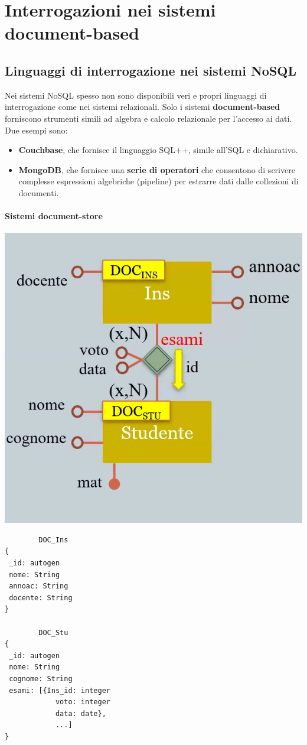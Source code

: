 \documentclass{report}
\begin{document}
\chapter{Interrogazioni nei sistemi document-based}

\section{Linguaggi di interrogazione nei sistemi NoSQL}

Nei sistemi NoSQL spesso non sono disponibili veri e propri linguaggi di interrogazione come nei sistemi relazionali. Solo i sistemi \textbf{document-based} forniscono strumenti simili ad algebra e calcolo relazionale per l'accesso ai dati. Due esempi sono:
\begin{itemize}
\item \textbf{Couchbase}, che fornisce il linguaggio SQL++, simile all'SQL e dichiarativo.
\item \textbf{MongoDB}, che fornisce una \textbf{serie di operatori} che consentono di scrivere complesse espressioni algebriche (pipeline) per estrarre dati dalle collezioni di documenti.
\end{itemize}

\subsubsection{Sistemi document-store}
\begin{multicols}{2}
\includegraphics[scale=0.4]{document_store_example} 
\newcolumn
\begin{lstlisting}
		DOC_Ins
{
 _id: autogen
 nome: String
 annoac: String
 docente: String
}

		DOC_Stu
{
 _id: autogen
 nome: String
 cognome: String
 esami: [{Ins_id: integer
 			voto: integer
 			data: date},
 			...]
}
\end{lstlisting}
\end{multicols}
\newpage
\end{document}
